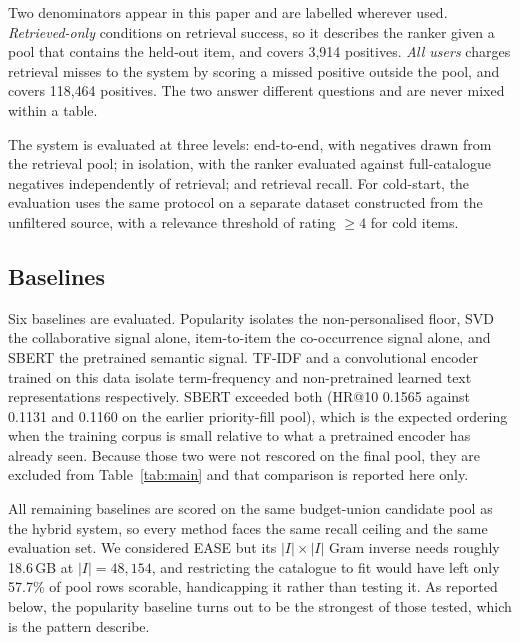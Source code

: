 \documentclass[10pt,twocolumn]{article}
\begin{document}
Two denominators appear in this paper and are labelled wherever used.
\emph{Retrieved-only} conditions on retrieval success, so it describes the
ranker given a pool that contains the held-out item, and covers 3{,}914
positives. \emph{All users} charges retrieval misses to the system by scoring
a missed positive outside the pool, and covers 118{,}464 positives. The two
answer different questions and are never mixed within a table.

The system is evaluated at three levels: end-to-end, with negatives drawn from
the retrieval pool; in isolation, with the ranker evaluated against
full-catalogue negatives independently of retrieval; and retrieval recall. For
cold-start, the evaluation uses the same protocol on a separate dataset
constructed from the unfiltered source, with a relevance threshold of
rating $\ge 4$ for cold items.

\subsection{Baselines}
\label{sec:baselines}

Six baselines are evaluated. Popularity isolates the non-personalised floor,
SVD the collaborative signal alone, item-to-item the co-occurrence signal
alone, and SBERT the pretrained semantic signal. TF-IDF and a convolutional
encoder trained on this data isolate term-frequency and non-pretrained
learned text representations respectively. SBERT exceeded both
(HR@10 0.1565 against 0.1131 and 0.1160 on the earlier priority-fill pool),
which is the expected ordering when the training corpus is small relative to
what a pretrained encoder has already seen. Because those two were not
rescored on the final pool, they are excluded from
Table~\ref{tab:main} and that comparison is reported here only.

All remaining baselines are scored on the same budget-union candidate pool as
the hybrid system, so every method faces the same recall ceiling and the same
evaluation set. We considered EASE \citep{steck2019embarrassingly} but its
$|I| \times |I|$ Gram inverse needs roughly 18.6\,GB at $|I| = 48{,}154$, and
restricting the catalogue to fit would have left only 57.7\% of pool rows
scorable, handicapping it rather than testing it. As reported below, the
popularity baseline turns out to be the strongest of those tested, which is
the pattern \citet{dacrema2019really} describe.

\end{document}
